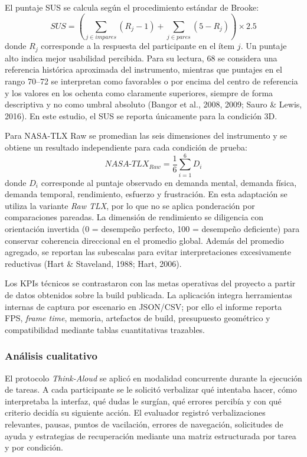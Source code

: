 El puntaje SUS se calcula según el procedimiento estándar de Brooke:
\[
SUS = \left(\sum_{j \in impares}(R_j - 1) + \sum_{j \in pares}(5 - R_j)\right)\times 2.5
\]
donde $R_j$ corresponde a la respuesta del participante en el ítem $j$. Un puntaje alto indica mejor usabilidad percibida. Para su lectura, 68 se considera una referencia histórica aproximada del instrumento, mientras que puntajes en el rango 70--72 se interpretan como favorables o por encima del centro de referencia y los valores en los ochenta como claramente superiores, siempre de forma descriptiva y no como umbral absoluto (Bangor et al., 2008, 2009; Sauro \& Lewis, 2016). En este estudio, el SUS se reporta únicamente para la condición 3D.

Para NASA-TLX Raw se promedian las seis dimensiones del instrumento y se obtiene un resultado independiente para cada condición de prueba:
\[
NASA\text{-}TLX_{Raw} = \frac{1}{6}\sum_{i=1}^{6} D_i
\]
donde $D_i$ corresponde al puntaje observado en demanda mental, demanda física, demanda temporal, rendimiento, esfuerzo y frustración. En esta adaptación se utiliza la variante \textit{Raw TLX}, por lo que no se aplica ponderación por comparaciones pareadas. La dimensión de rendimiento se diligencia con orientación invertida (0 = desempeño perfecto, 100 = desempeño deficiente) para conservar coherencia direccional en el promedio global. Además del promedio agregado, se reportan las subescalas para evitar interpretaciones excesivamente reductivas (Hart \& Staveland, 1988; Hart, 2006).

Los KPIs técnicos se contrastaron con las metas operativas del proyecto a partir de datos obtenidos sobre la build publicada. La aplicación integra herramientas internas de captura por escenario en JSON/CSV; por ello el informe reporta FPS, \textit{frame time}, memoria, artefactos de build, presupuesto geométrico y compatibilidad mediante tablas cuantitativas trazables.

\subsubsection{Análisis cualitativo}

El protocolo \textit{Think-Aloud} se aplicó en modalidad concurrente durante la ejecución de tareas. A cada participante se le solicitó verbalizar qué intentaba hacer, cómo interpretaba la interfaz, qué dudas le surgían, qué errores percibía y con qué criterio decidía su siguiente acción. El evaluador registró verbalizaciones relevantes, pausas, puntos de vacilación, errores de navegación, solicitudes de ayuda y estrategias de recuperación mediante una matriz estructurada por tarea y por condición.

